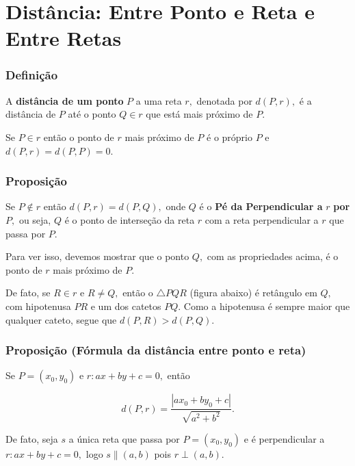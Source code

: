 \documentclass[
  brazilian,
  letterpaper,
  DIV=11,
  numbers=noendperiod]{scrreprt}
\theoremstyle{definition}
\theoremstyle{plain}
\theoremstyle{definition}
\theoremstyle{remark}
\begin{document}

\chapter{Distância: Entre Ponto e Reta e Entre
Retas}\label{distuxe2ncia-entre-ponto-e-reta-e-entre-retas}

\subsection{Definição}\label{definiuxe7uxe3o-11}

A \textbf{distância de um ponto} \(P\) a uma reta \(r,\) denotada por
\(d(P,r),\) é a distância de \(P\) até o ponto \(Q\in r\) que está mais
próximo de \(P.\)

Se \(P\in r\) então o ponto de \(r\) mais próximo de \(P\) é o próprio
\(P\) e \(d(P,r)=d(P,P)=0.\)

\subsection{Proposição}\label{proposiuxe7uxe3o-15}

Se \(P\notin r\) então \(d(P,r)=d(P,Q),\) onde \(Q\) é o \textbf{Pé da
Perpendicular a} \(r\) \textbf{por} \(P,\) ou seja, \(Q\) é o ponto de
interseção da reta \(r\) com a reta perpendicular a \(r\) que passa por
\(P.\)

Para ver isso, devemos mostrar que o ponto \(Q,\) com as propriedades
acima, é o ponto de \(r\) mais próximo de \(P.\)

De fato, se \(R\in r\) e \(R\neq Q,\) então o \(\bigtriangleup PQR\)
(figura abaixo) é retângulo em \(Q,\) com hipotenusa \(PR\) e um dos
catetos \(PQ.\) Como a hipotenusa é sempre maior que qualquer cateto,
segue que \(d(P,R)>d(P,Q).\)

\subsection{Proposição (Fórmula da distância entre ponto e
reta)}\label{proposiuxe7uxe3o-fuxf3rmula-da-distuxe2ncia-entre-ponto-e-reta}

Se \(P=(x_0,y_0)\) e \(r:ax+by+c=0,\) então

\[
d(P,r)=\frac{|ax_0+by_0+c|}{\sqrt{a^2+b^2}}.
\]

De fato, seja \(s\) a única reta que passa por \(P=(x_0,y_0)\) e é
perpendicular a \(r:ax+by+c=0,\) logo \(s\parallel (a,b)\) pois
\(r\perp (a,b)\).
\end{document}
